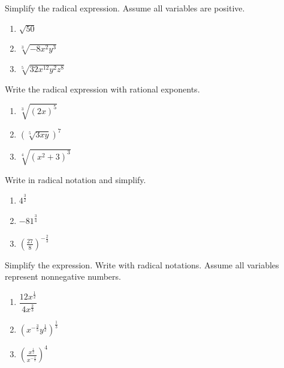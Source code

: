 \documentclass[en,12pt]{elegantbook}
\providecommand{\tightlist}{%
  \setlength{\itemsep}{0pt}\setlength{\parskip}{0pt}}
\providecommand{\tightlist}{%
  \setlength{\itemsep}{0pt}\setlength{\parskip}{0pt}}
\let\BeginKnitrBlock\begin \let\EndKnitrBlock\end
\begin{document}
\BeginKnitrBlock{exercise}
\protect\hypertarget{exr:unnamed-chunk-88}{}{\label{exr:unnamed-chunk-88} }
Simplify the radical expression. Assume all variables are positive.

\begin{enumerate}
\def\labelenumi{\arabic{enumi}.}
\tightlist
\item
  \(\sqrt{50}\)
\item
  \(\sqrt[3]{-8x^2y^3}\)
\item
  \(\sqrt[5]{32x^{12}y^2z^8}\)
\end{enumerate}
\EndKnitrBlock{exercise}

\BeginKnitrBlock{exercise}
\protect\hypertarget{exr:unnamed-chunk-89}{}{\label{exr:unnamed-chunk-89} }
Write the radical expression with rational exponents.

\begin{enumerate}
\def\labelenumi{\arabic{enumi}.}
\tightlist
\item
  \(\sqrt[3]{(2x)^5}\)
\item
  \((\sqrt[5]{3xy})^7\)
\item
  \(\sqrt[4]{(x^2+3)^3}\)
\end{enumerate}
\EndKnitrBlock{exercise}

\BeginKnitrBlock{exercise}
\protect\hypertarget{exr:unnamed-chunk-90}{}{\label{exr:unnamed-chunk-90} }
Write in radical notation and simplify.

\begin{enumerate}
\def\labelenumi{\arabic{enumi}.}
\tightlist
\item
  \(4^{\frac32}\)
\item
  \(-81^{\frac 34}\)
\item
  \(\left(\frac{27}{8}\right)^{-\frac{2}{3}}\)
\end{enumerate}
\EndKnitrBlock{exercise}

\BeginKnitrBlock{exercise}
\protect\hypertarget{exr:unnamed-chunk-91}{}{\label{exr:unnamed-chunk-91} }
Simplify the expression. Write with radical notations. Assume all variables represent nonnegative numbers.

\begin{enumerate}
\def\labelenumi{\arabic{enumi}.}
\tightlist
\item
  \(\dfrac{12x^{\frac12}}{4x^{\frac23}}\)
\item
  \((x^{-\frac35}y^{\frac12})^{\frac13}\)
\item
  \(\left(\frac{x^{\frac12}}{x^{-\frac13}}\right)^4\)
\end{enumerate}
\EndKnitrBlock{exercise}
\end{document}
